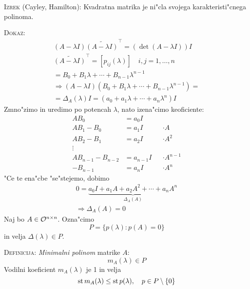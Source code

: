 \textsc{Izrek} (Cayley, Hamilton): Kvadratna matrika je ni"cla svojega karakteristi"cnega polinoma.

\textsc{Dokaz:}
\begin{gather*}
(A - \lambda I) \widetilde{(A - \lambda I)}^\intercal = (\det (A - \lambda I)) I \\
\widetilde{(A - \lambda I)}^\intercal = [p_{ij}(\lambda)] \quad i, j = 1, \ldots, n \\
= B_0 + B_1 \lambda + \cdots + B_{n-1} \lambda^{n-1} \\
\Rightarrow (A - \lambda I) (B_0 + B_1 \lambda + \cdots + B_{n-1} \lambda^{n-1}) = \\
= \Delta_A(\lambda) I = (a_0 + a_1 \lambda + \cdots + a_n \lambda^{n}) I
\end{gather*}
Zmno"zimo in uredimo po potencah $\lambda$, nato izena"cimo keoficiente:
\begin{align*}
AB_0 &= a_0 I \\
A B_1 - B_0 &= a_1 I  && \cdot A\\
A B_2 - B_1 &= a_2 I  && \cdot A^2 \\
\vdots \\
A B_{n-1} - B_{n-2} &= a_{n-1} I && \cdot A^{n-1}\\
- B_{n-1} &= a_n I && \cdot A^n
\end{align*}
"Ce te ena"cbe "se"stejemo, dobimo
\begin{gather*}
0 = \underbrace{a_0 I + a_1 A + a_2 A^2 + \cdots + a_n A^n}_{\Delta_A(A)} \\
\Rightarrow \Delta_A(A) = 0
\end{gather*}
%
Naj bo $A \in \mathcal{O}^{n \times n}$. Ozna"cimo
\begin{equation*}
P = \{p(\lambda): p(A) = 0\}
\end{equation*}
in velja $\Delta(\lambda) \in P$.

\textsc{Definicija:} \emph{Minimalni polinom} matrike $A$: 
\begin{equation*}
m_A (\lambda) \in P
\end{equation*}
Vodilni koeficient $m_A (\lambda)$ je 1 in velja
\begin{equation*}
\operatorname{st} m_A (\lambda) \leq \operatorname{st} p(\lambda), \quad p \in P \setminus \{0\}
\end{equation*}
